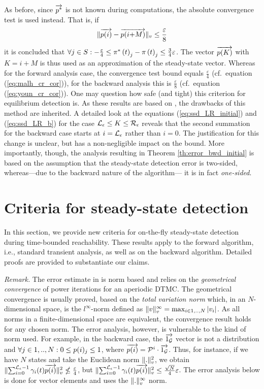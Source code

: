\documentclass[a4paper,11pt]{article}
\newcommand{\Section}[1]{\section{#1}}
\begin{document}
		As before, since $\overrightarrow{p^{*}}$ is not known during computations, the absolute convergence test is used instead.  That is, if
		\begin{equation}
			\lVert \overrightarrow{p(i)} - \overrightarrow{p(i{+}M)} \rVert_{v} \leq \frac{\varepsilon}{8} \label{eq:youn_cr}
		\end{equation}
		it is concluded that $\forall j \in S : -\frac{\varepsilon}{4} \leq \pi^{*} \left( t \right)_{j} - \pi \left( t \right)_{j} \leq \frac{3}{4}\varepsilon$.  The vector $\overrightarrow{p(K)}$ with $K=i{+}M$ is thus used as an approximation of the steady-state vector. Whereas for the forward analysis case, the convergence test bound equals $\frac{\varepsilon}{4}$ (cf.\ equation (\ref{eq:malh_cr_cor})), for the backward analysis this is $\frac{\varepsilon}{8}$  (cf.\ equation (\ref{eq:youn_cr_cor})).  One may question how safe (and tight) this criterion for equilibrium detection is.  As these results are based on \cite{MalhotraMT_MR94}, the drawbacks of this method are inherited.  A detailed look at the equations (\ref{eq:ssd_LR_initial}) and (\ref{eq:ssd_LR_b}) for the case $\mathcal{L}_{\epsilon} \leq K \leq \mathcal{R}_{\epsilon}$ reveals that the second summation for the backward case starts at $i=\mathcal{L}_{\epsilon}$ rather than $i=0$.  The justification for this change is unclear, but has a non-negligible impact on the bound.  More importantly, though,  the analysis resulting in Theorem \ref{th:error_bwd_initial} is based on the assumption that the steady-state detection error is two-sided, whereas---due to the backward nature of the algorithm--- it is in fact \emph{one-sided}.
		
\Section{Criteria for steady-state detection \label{s:ss_detect_improved}}

	In this section, we provide new criteria for on-the-fly steady-state detection during time-bounded reachability.  These results apply to the forward algorithm, i.e., standard transient analysis, as well as on the backward algorithm.  Detailed proofs are provided to substantiate our claims.

	{\it Remark.} The error estimate in \cite{MalhotraMT_MR94} is norm based and relies on the \emph{geometrical convergence} of power iterations for an aperiodic DTMC. The geometrical convergence is usually proved, based on the \emph{total variation norm} which, in an $N$-dimensional space, is the $l^{\infty}$-norm defined as $\lVert  v  \rVert_{v}^{\infty} = \max_{i \in 1,..,N} |v_{i}|$. As all norms in a finite-dimensional space are equivalent, the convergence result holds for any chosen norm.  The error analysis, however, is vulnerable to the kind of norm used.  For example, in the backward case, the $\overrightarrow{1_{\mathcal{G}}}$ vector is not a distribution and $\forall j \in 1,..,N: 0 \leq p(i)_{j} \leq 1$, where $\overrightarrow{p(i)}=\mathcal{P}^{i} \cdot \overrightarrow{1_{\mathcal{G}}}$. Thus, for instance, if we have $N$ states and take the Euclidean norm $\lVert  .  \rVert_{v}^{2}$, we obtain $\lVert  \sum_{i=0}^{\mathcal{L}_{\epsilon}-1} \gamma_{i}(t) \overrightarrow{p(i)}  \rVert_{v}^{2} \nleq \frac{\varepsilon}{4}$, but $\lVert  \sum_{i=0}^{\mathcal{L}_{\epsilon}-1} \gamma_{i}(t) \overrightarrow{p(i)}  \rVert_{v}^{2} \leq \frac{\sqrt{N}}{4}\varepsilon$.  The error analysis below is done for vector elements and uses the $\lVert  .  \rVert_{v}^{\infty}$ norm.
					
\end{document}
